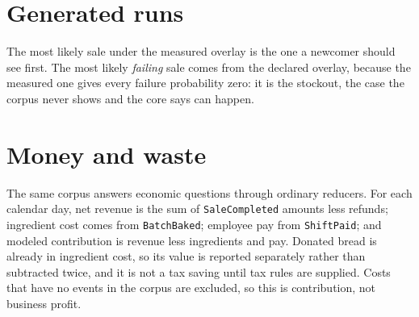 \section{Generated runs}

The most likely sale under the measured overlay is the one a newcomer should
see first. The most likely \emph{failing} sale comes from the declared overlay,
because the measured one gives every failure probability zero: it is the
stockout, the case the corpus never shows and the core says can happen.

\begin{bakeryfigure}
\caption{The usual sale, with mean times measured from the corpus.}
\label{fig:bakery-run-sale}
\end{bakeryfigure}

\begin{bakeryfigure}
\caption{The most likely failing sale under the declared overlay: a stockout,
probability $3/100$, never seen in the corpus.}
\label{fig:bakery-run-failure}
\end{bakeryfigure}

\section{Money and waste}

The same corpus answers economic questions through ordinary reducers. For each
calendar day, net revenue is the sum of \texttt{SaleCompleted} amounts less
refunds; ingredient cost comes from \texttt{BatchBaked}; employee pay from
\texttt{ShiftPaid}; and modeled contribution is revenue less ingredients and
pay. Donated bread is already in ingredient cost, so its value is reported
separately rather than subtracted twice, and it is not a tax saving until tax
rules are supplied. Costs that have no events in the corpus are excluded, so
this is contribution, not business profit.

